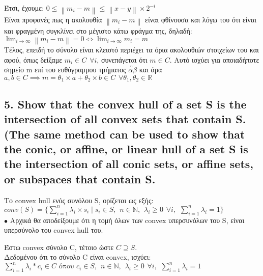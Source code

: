 \documentclass[12pt]{article}
\newcommand{\R}{\mathbb{R}}
\newcommand{\N}{\mathbb{N}}
\newcommand{\norm}[1]{\left\lVert#1\right\rVert}
\newcommand{\margin}{\hspace{5pt}}
\begin{document}
Έτσι, έχουμε: $0 \leq \norm{m_i - m} \leq \norm{x - y} \times 2^{-i}$\\

Είναι προφανές πως η ακολουθία $\norm{m_i - m}$ είναι φθίνουσα και λόγω του ότι είναι
και φραγμένη συγκλίνει στο μέγιστο κάτω φράγμα της, δηλαδή:\\

$\lim_{i \to \infty} \norm{m_i - m} = 0 \Leftrightarrow \lim_{i \to \infty} m_i = m$\\

Τέλος, επειδή το σύνολο είναι κλειστό περιέχει τα όρια ακολουθιών στοιχείων του και αφού,
όπως δείξαμε $m_i \in C \margin \forall i$, συνεπάγεται ότι $m \in C$. Αυτό ισχύει για
οποιαδήποτε σημείο m επί του ευθύγραμμου τμήματος $\overleftrightarrow{αβ}$ και άρα
$a, b \in C \implies m = \theta_1 \times a + \theta_2 \times b \in C \margin \forall \theta_1, \theta_2 \in \R$

\vspace{2in} %

\subsection*{5. Show that the convex hull of a set S is the intersection of all convex sets that contain
S.(The same method can be used to show that the conic, or affine, or linear hull of a set S is
the intersection of all conic sets, or affine sets, or subspaces that contain S.}

Το convex hull ενός συνόλου S, ορίζεται ως εξής:\\

$conv(S) = \lbrace \sum_{i = 1}^{n} λ_i \times s_i
\mid
s_i \in S, \margin
n \in \N, \margin
λ_i \geq 0 \margin \forall i, \margin
\sum_{i = 1}^{n} λ_i = 1
\rbrace$\\

$\bullet$ Αρχικά θα αποδείξουμε ότι η τομή όλων των convex υπερσυνόλων του S,
είναι υπερσύνολο του convex hull του.

Έστω convex σύνολο C, τέτοιο ώστε $C \supseteq S$.\\

Δεδομένου ότι το σύνολο C είναι convex, ισχύει:\\

$\sum_{i = 1}^{n} λ_i * c_i \in C \text{ όπου }
c_i \in S, \margin
n \in \N, \margin
λ_i \geq 0 \margin \forall i, \margin
\sum_{i = 1}^{n} λ_i = 1$\\
\end{document}
